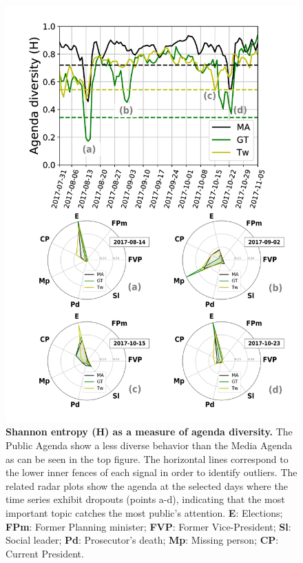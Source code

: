 \documentclass{bmcart}
\begin{document}
\begin{backmatter}
\begin{figure}[h!]
\includegraphics[height=0.7\textheight]{Fig3.pdf}
\caption{\textbf{Shannon entropy (H) as a measure of agenda diversity.} The Public Agenda show a less diverse behavior than the Media Agenda as can be seen in the top figure. The horizontal lines correspond to the lower inner fences of each signal in order to identify outliers. The related radar plots show  the agenda at the selected days where the time series exhibit dropouts (points a-d), indicating that the most important topic catches the most public's attention. \textbf{E}: Elections; \textbf{FPm}: Former Planning minister; \textbf{FVP}: Former Vice-President; \textbf{Sl}: Social leader; \textbf{Pd}: Prosecutor's death; \textbf{Mp}: Missing person; \textbf{CP}: Current President. }
\label{fig:shannon_entropy_agendas}
\end{figure}


\end{backmatter}
\end{document}
